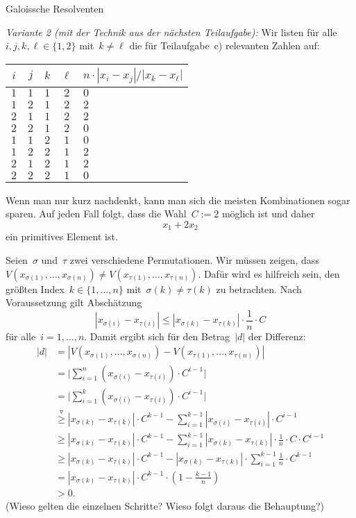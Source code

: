 \documentclass{algblatt}
\begin{document}
\begin{aufgabe}{Galoissche Resolventen}
\begin{loesungE}
\emph{Variante 2 (mit der Technik aus der nächsten Teilaufgabe):} Wir listen
für alle~$i,j,k,\ell \in \{ 1, 2 \}$ mit~$k \neq \ell$ die für Teilaufgabe~c)
relevanten Zahlen auf:
\begin{center}
  \begin{tabular}{c|c|c|c|l}
    $i$ & $j$ & $k$ & $\ell$ & $n \cdot |x_i - x_j| / |x_k - x_\ell|$ \\\hline
    $1$ & $1$ & $1$ & $2$ & $0$ \\
    $1$ & $2$ & $1$ & $2$ & $2$ \\
    $2$ & $1$ & $1$ & $2$ & $2$ \\
    $2$ & $2$ & $1$ & $2$ & $0$ \\
    $1$ & $1$ & $2$ & $1$ & $0$ \\
    $1$ & $2$ & $2$ & $1$ & $2$ \\
    $2$ & $1$ & $2$ & $1$ & $2$ \\
    $2$ & $2$ & $2$ & $1$ & $0$
  \end{tabular}
\end{center}
Wenn man nur kurz nachdenkt, kann man sich die meisten Kombinationen sogar
sparen. Auf jeden Fall folgt, dass die Wahl~$C := 2$ möglich ist und daher
\[ x_1 + 2 x_2 \]
ein primitives Element ist.

\item Seien~$\sigma$ und~$\tau$ zwei verschiedene Permutationen. Wir müssen
zeigen, dass~$V(x_{\sigma(1)},\ldots,x_{\sigma(n)}) \neq
V(x_{\tau(1)},\ldots,x_{\tau(n)})$. Dafür wird es hilfreich sein, den größten
Index~$k \in \{ 1,\ldots,n \}$ mit~$\sigma(k) \neq \tau(k)$ zu betrachten. Nach
Voraussetzung gilt Abschätzung
\[ |x_{\sigma(i)} - x_{\tau(i)}| \leq
  |x_{\sigma(k)} - x_{\tau(k)}| \cdot
  \frac{1}{n} \cdot C \]
für alle~$i = 1,\ldots,n$. Damit ergibt sich für den Betrag~$|d|$ der
Differenz:
\begin{align*}
  |d| &= |V(x_{\sigma(1)},\ldots,x_{\sigma(n)}) -
  V(x_{\tau(1)},\ldots,x_{\tau(n)})| \\
  &=
  \Biggl|\sum_{i=1}^n (x_{\sigma(i)} - x_{\tau(i)}) \cdot C^{i-1}\Biggr| \\
  &= \Biggl|\sum_{i=1}^k (x_{\sigma(i)} - x_{\tau(i)}) \cdot C^{i-1}\Biggr| \\
  &\stackrel{\triangledown}{\geq} |x_{\sigma(k)} - x_{\tau(k)}| \cdot C^{k-1} - \sum_{i=1}^{k-1}
  |x_{\sigma(i)} - x_{\tau(i)}| \cdot C^{i-1}\\
  &\geq |x_{\sigma(k)} - x_{\tau(k)}| \cdot C^{k-1} - \sum_{i=1}^{k-1}
  |x_{\sigma(k)} - x_{\tau(k)}| \cdot \frac{1}{n} \cdot C \cdot C^{i-1} \\
  &\geq |x_{\sigma(k)} - x_{\tau(k)}| \cdot C^{k-1} - |x_{\sigma(k)} -
  x_{\tau(k)}| \cdot \sum_{i=1}^{k-1}
  \frac{1}{n} \cdot C^{k-1} \\
  &= |x_{\sigma(k)} - x_{\tau(k)}| \cdot C^{k-1} \cdot \left(1 -
  \frac{k-1}{n}\right) \\
  &> 0.
\end{align*}
(Wieso gelten die einzelnen Schritte? Wieso folgt daraus die Behauptung?)
\end{loesungE}
\end{aufgabe}
\end{document}
